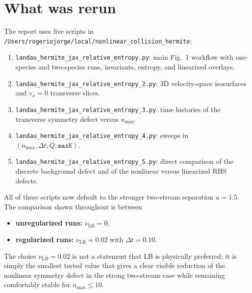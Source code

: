 \documentclass[11pt]{article}
\begin{document}
\section{What was rerun}
The report uses five scripts in
\texttt{/Users/rogeriojorge/local/nonlinear\_collision\_hermite}:
\begin{enumerate}[leftmargin=1.5em]
    \item \texttt{landau\_hermite\_jax\_relative\_entropy.py}: main Fig.~1 workflow with one-species and two-species runs, invariants, entropy, and linearized overlays.
    \item \texttt{landau\_hermite\_jax\_relative\_entropy\_2.py}: 3D velocity-space isosurfaces and $v_x=0$ transverse slices.
    \item \texttt{landau\_hermite\_jax\_relative\_entropy\_3.py}: time histories of the transverse symmetry defect versus $n_{\max}$.
    \item \texttt{landau\_hermite\_jax\_relative\_entropy\_4.py}: sweeps in $(n_{\max},\Delta t,Q,\texttt{maxK})$.
    \item \texttt{landau\_hermite\_jax\_relative\_entropy\_5.py}: direct comparison of the discrete background defect and of the nonlinear versus linearized RHS defects.
\end{enumerate}

All of these scripts now default to the stronger two-stream separation $u=1.5$.
The comparison shown throughout is between
\begin{itemize}[leftmargin=1.5em]
    \item \textbf{unregularized runs:} $\nu_{\mathrm{LB}}=0$,
    \item \textbf{regularized runs:} $\nu_{\mathrm{LB}}=0.02$ with $\Delta t=0.10$.
\end{itemize}
The choice $\nu_{\mathrm{LB}}=0.02$ is not a statement that LB is physically preferred; it is simply the smallest tested value that gives a clear visible reduction of the nonlinear symmetry defect in the strong two-stream case while remaining comfortably stable for $n_{\max}\le 10$.
\end{document}
